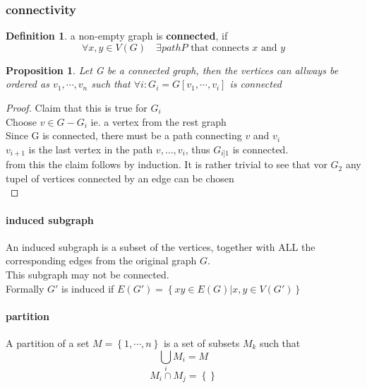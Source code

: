 \documentclass[a4paper]{article}
\newtheorem{proposition}[theorem]{Proposition}
\theoremstyle{definition}
\newtheorem*{definition}{Definition}
\theoremstyle{remark}
\begin{document}
\subsubsection{connectivity}
\label{ssub:connectivity}
\begin{definition}
a non-empty graph is \textbf{connected}, if
\begin{equation}
	\forall x,y\in V(G) \quad \exists path P \textrm{ that connects } x\textrm{ and }y   
\end{equation}
\end{definition}
\begin{proposition}
  Let G be a connected graph, then the vertices can allways be ordered as $v_1,\cdots,v_n$ such that $\forall i:G_i=G[v_1,\cdots,v_i]$ is connected
\end{proposition}
\begin{proof}
  Claim that this is true for $G_i$\\
	Choose $v\in G - G_i$ ie. a vertex from the rest graph\\
  Since G is connected, there must be a path connecting $v$ and $v_i$\\
$ v_{i+1}$ is the last vertex in the path $v,\ldots,v_i$, thus $G_{i]1}$ is connected.\\
from this the claim follows by induction. It is rather trivial to see that vor $G_2$ any tupel of vertices connected by an edge can be chosen \\
\end{proof}
\paragraph{induced subgraph}
\label{par:induced_subgraph}
An induced subgraph is a subset of the vertices, together with ALL the corresponding edges from the original graph $G$.\\
This subgraph may not be connected.\\
Formally $ G'$ is induced if $E(G')=\left\{ xy\in E(G)| x,y \in V(G') \right\}$
\paragraph{partition}
\label{par:partition}

A partition of a set $M=\left\{ 1,\cdots,n \right\}$ is a set of subsets  $M_k$ such that
\begin{equation}
\bigcup_iM_i=M
\end{equation}
\begin{equation}
  M_i\cap M_j=\left\{  \right\}
\end{equation}
\end{document}
